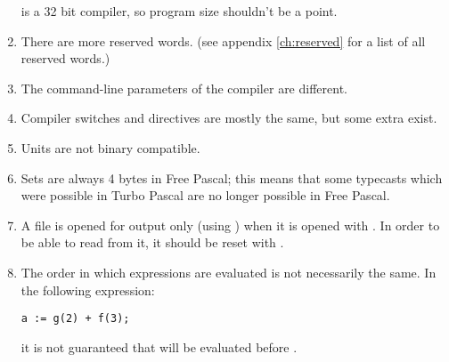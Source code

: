 \documentclass{report}
\begin{document}
\begin{enumerate}
\fpc is a 32 bit compiler, so program size shouldn't be a point.
\item There are more reserved words. (see appendix \ref{ch:reserved} for a
list of all reserved words.)
\item The command-line parameters of the compiler are different.
\item Compiler switches and directives are mostly the same, but some extra
exist.
\item Units are not binary compatible.
\item Sets are always 4 bytes in Free Pascal; this means that some typecasts
which were possible in Turbo Pascal are no longer possible in Free Pascal.
\item A file is opened for output only (using ) when it is
opened with . In order to be able to read from it, it should
be reset with .
\item The order in which expressions are evaluated is not necessarily the
same. In the following expression:
\begin{verbatim}
a := g(2) + f(3);
\end{verbatim}
it is not guaranteed that  will be evaluated before .
\end{enumerate}

\end{document}
